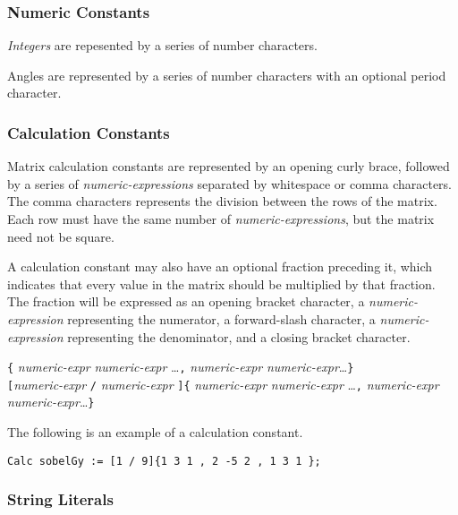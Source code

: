\subsubsection{Numeric Constants}
\label{sssec:numericconstants}

\emph{Integers} are repesented by a series of number characters.

Angles are represented by a series of number characters with an
optional period character.

\subsubsection{Calculation Constants}
\label{sssec:calcconstants}
Matrix calculation constants are represented by an opening curly brace, followed
by a series of \emph{numeric-expressions} separated by whitespace or
comma characters. The comma  characters represents the division between
the rows of the matrix. Each row must have the same number of
\emph{numeric-expressions}, but the matrix need not be square.

A calculation constant may also have an optional fraction preceding it,
which indicates that every value in the matrix should be multiplied
by that fraction. The fraction will be expressed as an opening
bracket character, a \emph{numeric-expression} representing the
numerator, a forward-slash character, a \emph{numeric-expression}
representing the denominator, and a closing bracket character.

\startsyn
\texttt{\{} \emph{numeric-expr} \emph{numeric-expr} \ldots \texttt{,} \emph{numeric-expr} \emph{numeric-expr}\ldots \texttt{\}} \\
\texttt{[}\emph{numeric-expr} \texttt{/} \emph{numeric-expr} \texttt{]}\texttt{\{} \emph{numeric-expr} \emph{numeric-expr} \ldots \texttt{,} \emph{numeric-expr} \emph{numeric-expr}\ldots \texttt{\}}
\stopsyn

The following is an example of a calculation constant.
\begin{lstlisting}[language=CLAM,escapechar=\%]
Calc sobelGy := [1 / 9]{1 3 1 , 2 -5 2 , 1 3 1 };
\end{lstlisting}

\subsubsection{String Literals}
\label{sssec:strings}


